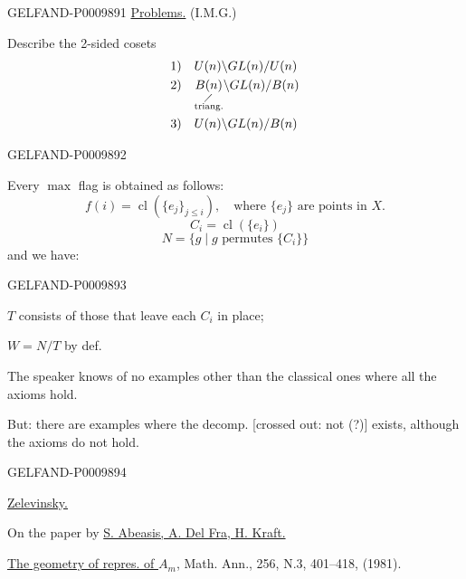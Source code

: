 \begin{GelfandAdjacentEvidence}{GELFAND-P000989}{1}
\underline{Problems.} (I.M.G.)

Describe the 2-sided cosets
\[
\begin{aligned}
1)&\quad U(n)\backslash GL(n)/U(n)\\
2)&\quad \underset{\substack{\diagup\\\text{triang.}}}{B(n)}
             \backslash GL(n)/B(n)\\
3)&\quad U(n)\backslash GL(n)/B(n)
\end{aligned}
\]
\end{GelfandAdjacentEvidence}
\begin{GelfandAdjacentEvidence}{GELFAND-P000989}{2}


Every $\max$ flag is obtained as follows:
\[
f(i)=\operatorname{cl}(\{e_j\}_{j\leq i}),\quad
\text{where }\{e_j\}\text{ are points in }X.
\]
\[
C_i=\operatorname{cl}(\{e_i\})
\]
\[
N=\{g\mid g\text{ permutes }\{C_i\}\}
\]
and we have:

\end{GelfandAdjacentEvidence}
\begin{GelfandAdjacentEvidence}{GELFAND-P000989}{3}


$T$ consists of those that leave each $C_i$ in place;

$W=N/T$ by def.

The speaker knows of no examples other than the classical ones where all the axioms hold.

But: there are examples where the decomp. [crossed out: not (?)] exists, although the axioms do not hold.
\end{GelfandAdjacentEvidence}
\begin{GelfandAdjacentEvidence}{GELFAND-P000989}{4}


\underline{Zelevinsky.}

On the paper by \underline{S. Abeasis, A. Del Fra, H. Kraft.}

\underline{The geometry of repres. of $A_m$}, Math. Ann., 256, N.3,
401--418, (1981).

\end{GelfandAdjacentEvidence}
